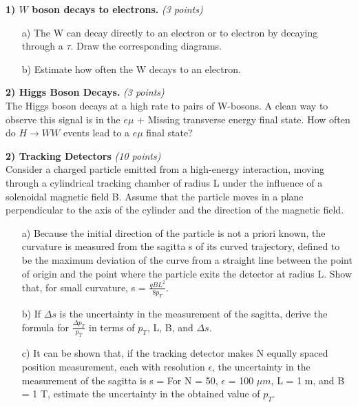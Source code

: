 {\large


\textbf{1)  $W$ boson decays to electrons. } \hfill \textit{(3 points)}\\
\begin{itemize}
\item[a)]{ The W can decay directly to an electron or to electron by decaying through a $\tau$. Draw the corresponding diagrams.}
\item[b)]{ Estimate how often the W decays to an electron. }
\end{itemize}           

\vspace*{0.25in}

\textbf{2) Higgs Boson Decays. } \hfill \textit{(3 points)}\\
The Higgs boson decays at a high rate to pairs of W-bosons.
A clean way to observe this signal is in the $e\mu$ + Missing transverse energy final state. How often do $H\rightarrow WW$ events lead to a $e\mu$ final state?

\vspace*{0.25in}


\textbf{2) Tracking Detectors } \hfill \textit{(10 points)}\\

Consider a charged particle emitted from a high-energy interaction, moving through a cylindrical tracking chamber of radius L under the influence of a solenoidal magnetic field B. 
Assume that the particle moves in a plane perpendicular to the axis of the cylinder and the direction of the magnetic field.
\begin{itemize}
\item[a)]{
Because the initial direction of the particle is not a priori known, the curvature is measured from the sagitta s of its curved trajectory, defined to be the maximum deviation of the curve from a straight line between the point of origin and the point where the particle exits the detector at radius L.
Show that, for small curvature, s = $\frac{qBL^2}{8p_T}$.}
\item[b)]{
If $\Delta s$ is the uncertainty in the measurement of the sagitta, derive the formula for $\frac{\Delta p_T}{p_T}$ in terms of $p_T$, L, B, and $\Delta s$.
}
\item[c)]{
It can be shown that, if the tracking detector makes N equally spaced position measurement, each with resolution $\epsilon$, the uncertainty in the measurement of the sagitta is
\be
\Delta s = 
\ee
For N = 50, $\epsilon$ = 100 $\mu m$, L = 1 m, and B = 1 T, estimate the uncertainty in the obtained value of $p_T$.
}
\end{itemize}

}
